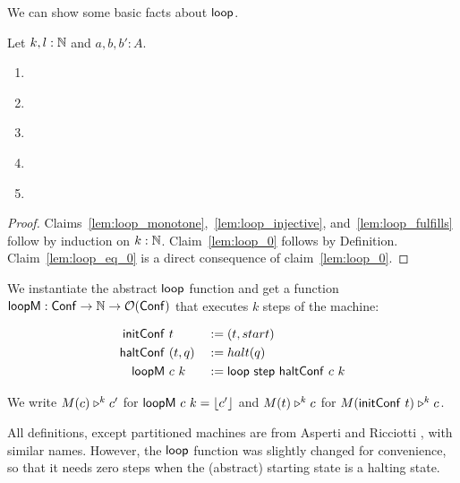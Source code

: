 We can show some basic facts about $\mathsf{loop}$.
\begin{lemma}
  \label{lem:loop}
  Let $k,l : \mathbb{N}$ and $a,b,b':A$.
  \begin{enumerate}
  \item \label{lem:loop_monotone}
  \item \label{lem:loop_injective}
  \item \label{lem:loop_fulfills}
  \item \label{lem:loop_0}
  \item \label{lem:loop_eq_0}
  \end{enumerate}
\end{lemma}
\begin{proof}
  Claims~\ref{lem:loop_monotone},~\ref{lem:loop_injective}, and~\ref{lem:loop_fulfills} follow by induction on $k : \mathbb{N}$.  Claim~\ref{lem:loop_0}
  follows by Definition.  Claim~\ref{lem:loop_eq_0} is a direct consequence of claim~\ref{lem:loop_0}.
\end{proof}


We instantiate the abstract $\mathsf{loop}$ function and get a function $\mathsf{loopM} : \mathsf{Conf} \rightarrow \mathbb{N} \rightarrow \mathcal{O}(\mathsf{Conf})$ that executes $k$ steps of the
machine:
\begin{definition}
  \begin{alignat*}{3}
    \mathsf{initConf}   &~t         &&:= (t, start) \\
    \mathsf{haltConf}   &~(t, q)    &&:= halt(q) \\
    \mathsf{loopM}      &~c~k       &&:= \mathsf{loop}~\mathsf{step}~\mathsf{haltConf}~c~k
  \end{alignat*}
\end{definition}

We write $M(c) \mathrel{\triangleright}^k c'$ for $\mathsf{loopM}~c~k = \left\lfloor {c'} \right\rfloor$ and $M(t) \mathrel{\triangleright}^k c$ for $M(\mathsf{initConf}~t) \mathrel{\triangleright}^k c$.

All definitions, except partitioned machines are from Asperti and Ricciotti \cite{asperti2015}, with similar names.  However, the $\mathsf{loop}$ function
was slightly changed for convenience, so that it needs zero steps when the (abstract) starting state is a halting state.

